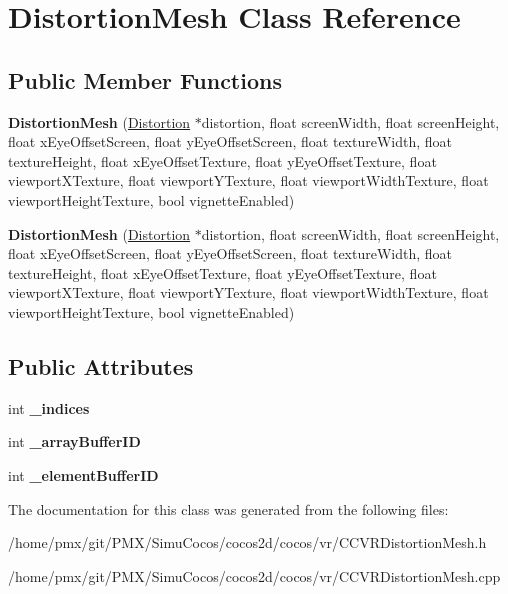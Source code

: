 \hypertarget{classDistortionMesh}{}\section{Distortion\+Mesh Class Reference}
\label{classDistortionMesh}
\subsection*{Public Member Functions}
\begin{DoxyCompactItemize}
\item 
\mbox{\label{classDistortionMesh_ad18d7757885804348ea7b95e52031fb7}} 
{\bfseries Distortion\+Mesh} (\hyperlink{classDistortion}{Distortion} $\ast$distortion, float screen\+Width, float screen\+Height, float x\+Eye\+Offset\+Screen, float y\+Eye\+Offset\+Screen, float texture\+Width, float texture\+Height, float x\+Eye\+Offset\+Texture, float y\+Eye\+Offset\+Texture, float viewport\+X\+Texture, float viewport\+Y\+Texture, float viewport\+Width\+Texture, float viewport\+Height\+Texture, bool vignette\+Enabled)
\item 
\mbox{\label{classDistortionMesh_a92184313e9cb64b3b338a11ca2a1bdec}} 
{\bfseries Distortion\+Mesh} (\hyperlink{classDistortion}{Distortion} $\ast$distortion, float screen\+Width, float screen\+Height, float x\+Eye\+Offset\+Screen, float y\+Eye\+Offset\+Screen, float texture\+Width, float texture\+Height, float x\+Eye\+Offset\+Texture, float y\+Eye\+Offset\+Texture, float viewport\+X\+Texture, float viewport\+Y\+Texture, float viewport\+Width\+Texture, float viewport\+Height\+Texture, bool vignette\+Enabled)
\end{DoxyCompactItemize}
\subsection*{Public Attributes}
\begin{DoxyCompactItemize}
\item 
\mbox{\label{classDistortionMesh_a0d0c059fedcf7be2a79e3951159c253a}} 
int {\bfseries \+\_\+indices}
\item 
\mbox{\label{classDistortionMesh_ae0013b778d40a4aa6b9ed767e4c4d1cf}} 
int {\bfseries \+\_\+array\+Buffer\+ID}
\item 
\mbox{\label{classDistortionMesh_ad911182fd63a17e4a122a260c826f0ae}} 
int {\bfseries \+\_\+element\+Buffer\+ID}
\end{DoxyCompactItemize}


The documentation for this class was generated from the following files\+:\begin{DoxyCompactItemize}
\item 
/home/pmx/git/\+P\+M\+X/\+Simu\+Cocos/cocos2d/cocos/vr/C\+C\+V\+R\+Distortion\+Mesh.\+h\item 
/home/pmx/git/\+P\+M\+X/\+Simu\+Cocos/cocos2d/cocos/vr/C\+C\+V\+R\+Distortion\+Mesh.\+cpp\end{DoxyCompactItemize}
